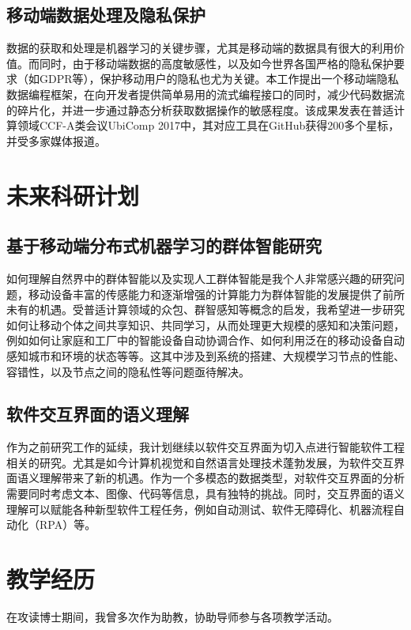 \documentclass[12pt]{article}
\begin{document}
\subsection{移动端数据处理及隐私保护}
数据的获取和处理是机器学习的关键步骤，尤其是移动端的数据具有很大的利用价值。而同时，由于移动端数据的高度敏感性，以及如今世界各国严格的隐私保护要求（如GDPR等），保护移动用户的隐私也尤为关键。本工作提出一个移动端隐私数据编程框架，在向开发者提供简单易用的流式编程接口的同时，减少代码数据流的碎片化，并进一步通过静态分析获取数据操作的敏感程度。该成果\cite{li2017privacystreams}发表在普适计算领域CCF-A类会议UbiComp 2017中，其对应工具在GitHub获得200多个星标\cite{privacystreams:code}，并受多家媒体报道。


\section{未来科研计划}

\subsection{基于移动端分布式机器学习的群体智能研究}
如何理解自然界中的群体智能以及实现人工群体智能是我个人非常感兴趣的研究问题，移动设备丰富的传感能力和逐渐增强的计算能力为群体智能的发展提供了前所未有的机遇。受普适计算领域的众包、群智感知等概念的启发，我希望进一步研究如何让移动个体之间共享知识、共同学习，从而处理更大规模的感知和决策问题，例如如何让家庭和工厂中的智能设备自动协调合作、如何利用泛在的移动设备自动感知城市和环境的状态等等。这其中涉及到系统的搭建、大规模学习节点的性能、容错性，以及节点之间的隐私性等问题亟待解决。

\subsection{软件交互界面的语义理解}
作为之前研究工作的延续，我计划继续以软件交互界面为切入点进行智能软件工程相关的研究。尤其是如今计算机视觉和自然语言处理技术蓬勃发展，为软件交互界面语义理解带来了新的机遇。作为一个多模态的数据类型，对软件交互界面的分析需要同时考虑文本、图像、代码等信息，具有独特的挑战。同时，交互界面的语义理解可以赋能各种新型软件工程任务，例如自动测试、软件无障碍化、机器流程自动化（RPA）等。

\section{教学经历}

在攻读博士期间，我曾多次作为助教，协助导师参与各项教学活动。
\end{document}
